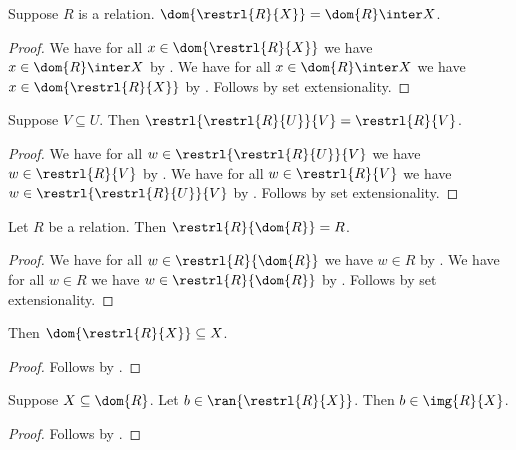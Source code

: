 \begin{corollary}%
\label{dom_of_restrl_eq_inter}
    Suppose $R$ is a relation.
    $\dom{\restrl{R}{X}} = \dom{R}\inter X$.
\end{corollary}
\begin{proof}
    We have for all $x\in\dom{\restrl{R}{X}}$
        we have $x\in\dom{R}\inter X$
        by .
    We have for all $x\in\dom{R}\inter X$
        we have $x\in\dom{\restrl{R}{X}}$
        by .
    Follows by set extensionality.
\end{proof}

\begin{proposition}\label{restrl_restrl}
    Suppose $V\subseteq U$.
    Then $\restrl{\restrl{R}{U}}{V} = \restrl{R}{V}$.
\end{proposition}
\begin{proof}
    We have for all $w\in\restrl{\restrl{R}{U}}{V}$
        we have $w\in\restrl{R}{V}$
        by .
    We have for all $w\in\restrl{R}{V}$
        we have $w\in\restrl{\restrl{R}{U}}{V}$
        by .
    Follows by set extensionality.
\end{proof}

\begin{proposition}\label{restrl_by_dom}
    Let $R$ be a relation.
    Then $\restrl{R}{\dom{R}} = R$.
\end{proposition}
\begin{proof}
    We have for all $w\in\restrl{R}{\dom{R}}$ we have $w\in R$
        by .
    We have for all $w\in R$ we have $w\in\restrl{R}{\dom{R}}$
        by .
    Follows by set extensionality.
\end{proof}

\begin{proposition}\label{restrl_dom}
    Then $\dom{\restrl{R}{X}}\subseteq X$.
\end{proposition}
\begin{proof}
    Follows by .
\end{proof}

\begin{proposition}\label{restrl_ran_elim}
    Suppose $X\subseteq\dom{R}$.
    Let $b\in\ran{\restrl{R}{X}}$.
    Then $b\in\img{R}{X}$.
\end{proposition}
\begin{proof}
    Follows by .
\end{proof}

